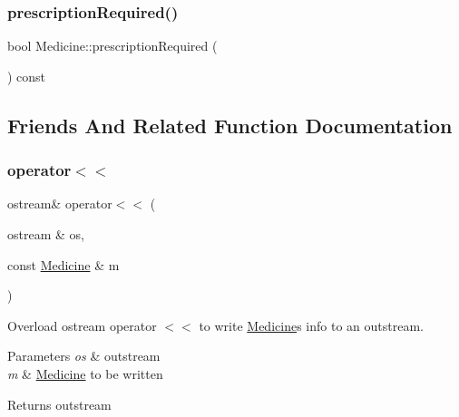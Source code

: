 \mbox{\label{classMedicine_ac69fcbbcfda660e3ee4df38282442dc4}} 
\subsubsection{\texorpdfstring{prescription\+Required()}{prescriptionRequired()}}
{\footnotesize\ttfamily bool Medicine\+::prescription\+Required (\begin{DoxyParamCaption}{ }\end{DoxyParamCaption}) const}



\subsection{Friends And Related Function Documentation}
\mbox{\label{classMedicine_ac59d59dad83c5b44d752d0dc6bdbf845}} 
\subsubsection{\texorpdfstring{operator$<$$<$}{operator<<}}
{\footnotesize\ttfamily ostream\& operator$<$$<$ (\begin{DoxyParamCaption}\item[{ostream \&}]{os,  }\item[{const \hyperlink{classMedicine}{Medicine} \&}]{m }\end{DoxyParamCaption})\hspace{0.3cm}{\ttfamily [friend]}}



Overload ostream operator $<$$<$ to write \hyperlink{classMedicine}{Medicine}\textquotesingle{}s info to an outstream. 


\begin{DoxyParams}{Parameters}
{\em os} & outstream\\
\hline
{\em m} & \hyperlink{classMedicine}{Medicine} to be written\\
\hline
\end{DoxyParams}
\begin{DoxyReturn}{Returns}
outstream 
\end{DoxyReturn}


